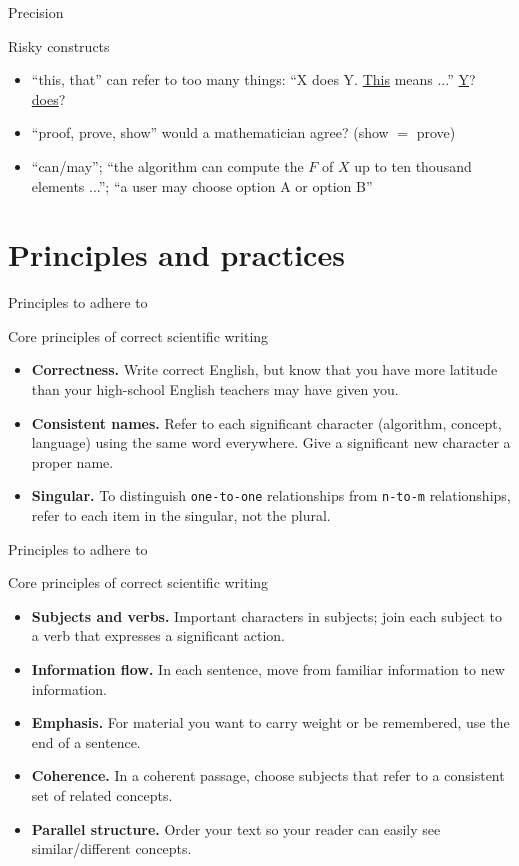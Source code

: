 \documentclass{beamer}
\begin{document}
\begin{frame}{Precision}
\begin{block}{Risky constructs}
\begin{itemize}
\item ``this, that'' can refer to too many things: ``X does Y. \underline{This} means ...'' \underline{Y}? \underline{does}?
\item ``proof, prove, show'' would a mathematician agree? (show $=$ prove)
\item ``can/may''; ``the algorithm can compute the $F$ of $X$ up to ten thousand elements ...''; ``a user may choose option A or option B''
\end{itemize}
\end{block}
\end{frame}

\section{Principles and practices}
\begin{frame}{Principles to adhere to}
\begin{block}{Core principles of correct scientific writing}
\begin{itemize}
\item \textbf{Correctness.} Write correct English, but know that you have more latitude than your high-school English teachers may have given you.
\item \textbf{Consistent names.} Refer to each significant character (algorithm, concept, language) using the same word everywhere. Give a significant new character a proper name.
\item \textbf{Singular.} To distinguish \texttt{one-to-one} relationships from \texttt{n-to-m} relationships, refer to each item in the singular, not the plural.
\end{itemize}
\end{block}
\end{frame}


\begin{frame}{Principles to adhere to}
\begin{block}{Core principles of correct scientific writing}
\begin{itemize}
\item \textbf{Subjects and verbs.} Important characters in subjects; join each subject to a verb that expresses a significant action.
\item \textbf{Information flow.} In each sentence, move from familiar information to new information.
\item \textbf{Emphasis.} For material you want to carry weight or be remembered, use the end of a sentence.
\item \textbf{Coherence.} In a coherent passage, choose subjects that refer to a consistent set of related concepts.
\item \textbf{Parallel structure.} Order your text so your reader can easily see similar/different concepts.
\end{itemize}
\end{block}
\end{frame}
\end{document}
